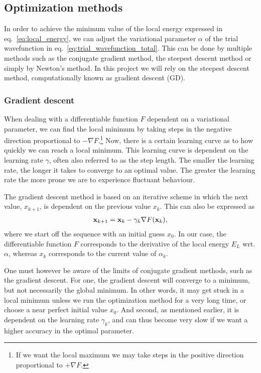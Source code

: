 \documentclass[
    a4paper, aps, twocolumn, floatfix, superscriptaddress,
    nofootinbib]{revtex4-1}
\begin{document}
\subsection{Optimization methods}
In order to achieve the minimum value of the local energy expressed in eq.~\eqref{eq:local_energy}, we can adjust the variational parameter $\alpha$ of the trial wavefunction in eq.~\eqref{eq:trial_wavefunction_total}. This can be done by multiple methods such as the conjugate gradient method, the steepest descent method or simply by Newton's method. In this project we will rely on the steepest descent method, computationally known as gradient descent (GD).
\subsubsection{Gradient descent}
When dealing with a differentiable function $F$ dependent on a variational parameter, we can find the local minimum by taking steps in the negative direction proportional to $-\nabla F$.\footnote{If we want the local maximum we may take steps in the positive direction proportional to $+\nabla F$.} Now, there is a certain learning curve as to how quickly we can reach a local minimum. This learning curve is dependent on the learning rate $\gamma$, often also referred to as the step length. The smaller the learning rate, the longer it takes to converge to an optimal value. The greater the learning rate the more prone we are to experience fluctuant behaviour.

The gradient descent method is based on an iterative scheme in which the next value, $x_{k+1}$, is dependent on the previous value $x_k$. This can also be expressed as
\begin{align}
    \bold x_{k+1} = \bold x_{k} - \gamma_k\nabla F(\bold x_k),
\end{align}
where we start off the sequence with an initial guess $x_0$. In our case, the differentiable function $F$ corresponds to the derivative of the local energy $E_L$ wrt. $\alpha$, whereas $x_k$ corresponds to the current value of $\alpha_k$.

One must however be aware of the limits of conjugate gradient methods, such as the gradient descent. For one, the gradient descent will converge to a minimum, but not necessarily the global minimum. In other words, it may get stuck in a local minimum unless we run the optimization method for a very long time, or choose a near perfect initial value $x_0$. And second, as mentioned earlier, it is dependent on the learning rate $\gamma_k$, and can thus become very slow if we want a higher accuracy in the optimal parameter.
\end{document}
